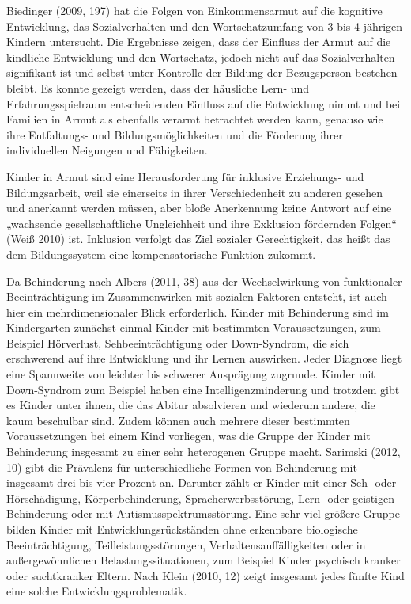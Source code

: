 Biedinger (2009, 197) hat die Folgen von Einkommensarmut auf die kognitive Entwicklung, das Sozialverhalten und den Wortschatzumfang von 3 bis 4-jährigen Kindern untersucht. Die Ergebnisse zeigen, dass der Einfluss der Armut auf die kindliche Entwicklung und den Wortschatz, jedoch nicht auf das Sozialverhalten signifikant ist und selbst unter Kontrolle der Bildung der Bezugsperson bestehen bleibt. Es konnte gezeigt werden, dass der häusliche Lern- und Erfahrungsspielraum entscheidenden Einfluss auf die Entwicklung nimmt und bei Familien in Armut als ebenfalls verarmt betrachtet werden kann, genauso wie ihre Entfaltungs- und Bildungsmöglichkeiten und die Förderung ihrer individuellen Neigungen und Fähigkeiten.

Kinder in Armut sind eine Herausforderung für inklusive Erziehungs- und Bildungsarbeit, weil sie einerseits in ihrer Verschiedenheit zu anderen gesehen und anerkannt werden müssen, aber bloße Anerkennung keine Antwort auf eine „wachsende gesellschaftliche Ungleichheit und ihre Exklusion fördernden Folgen“ (Weiß 2010) ist. Inklusion verfolgt das Ziel sozialer Gerechtigkeit, das heißt das dem Bildungssystem eine kompensatorische Funktion zukommt.       
 
Da Behinderung nach Albers (2011, 38) aus der Wechselwirkung von funktionaler Beeinträchtigung im Zusammenwirken mit sozialen Faktoren entsteht, ist auch hier ein mehrdimensionaler Blick erforderlich. Kinder mit Behinderung sind im Kindergarten zunächst einmal Kinder mit bestimmten Voraussetzungen, zum Beispiel Hörverlust, Sehbeeinträchtigung oder Down-Syndrom, die sich erschwerend auf ihre Entwicklung und ihr Lernen auswirken. Jeder Diagnose liegt eine Spannweite von leichter bis schwerer Ausprägung zugrunde. Kinder mit Down-Syndrom zum Beispiel haben eine Intelligenzminderung und trotzdem gibt es Kinder unter ihnen, die das Abitur absolvieren und wiederum andere, die kaum beschulbar sind. Zudem können auch mehrere dieser bestimmten Voraussetzungen bei einem Kind vorliegen, was die Gruppe der Kinder mit Behinderung insgesamt zu einer sehr heterogenen Gruppe macht. Sarimski (2012, 10) gibt die Prävalenz für unterschiedliche Formen von Behinderung mit insgesamt drei bis vier Prozent an. Darunter zählt er Kinder mit einer Seh- oder Hörschädigung, Körperbehinderung, Spracherwerbsstörung, Lern- oder geistigen Behinderung oder mit Autismusspektrumsstörung. 
Eine sehr viel größere Gruppe bilden Kinder mit Entwicklungsrückständen ohne erkennbare biologische Beeinträchtigung, Teilleistungsstörungen, Verhaltensauffälligkeiten oder in außergewöhnlichen Belastungssituationen, zum Beispiel Kinder psychisch kranker oder suchtkranker Eltern. Nach Klein (2010, 12) zeigt insgesamt jedes fünfte Kind eine solche Entwicklungsproblematik. 

